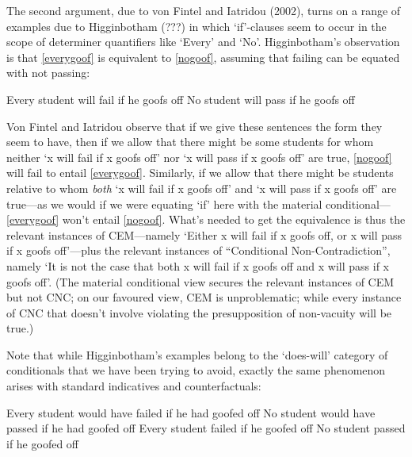 \documentclass[leqno, 11pt, a5paper, openany]{article}
\begin{document}
The second argument, due to von Fintel and Iatridou (2002), turns on a range of examples due to Higginbotham (???) in which ‘if’-clauses seem to occur in the scope of determiner quantifiers like ‘Every’ and ‘No’. Higginbotham's observation is that \ref{everygoof} is equivalent to \ref{nogoof}, assuming that failing can be equated with not passing:
\begin{prop}
	\nitem \label{everygoof}
	Every student will fail if he goofs off
	\nitem \label{nogoof}
	No student will pass if he goofs off
\end{prop}
Von Fintel and Iatridou observe that if we give these sentences the form they seem to have, then if we allow that there might be some students for whom neither ‘x will fail if x goofs off’ nor ‘x will pass if x goofs off’ are true, \ref{nogoof} will fail to entail \ref{everygoof}. Similarly, if we allow that there might be students relative to whom \emph{both} ‘x will fail if x goofs off’ and ‘x will pass if x goofs off’ are true---as we would if we were equating ‘if’ here with the material conditional---\ref{everygoof} won't entail \ref{nogoof}. What's needed to get the equivalence is thus the relevant instances of CEM---namely ‘Either x will fail if x goofs off, or x will pass if x goofs off’---plus the relevant instances of “Conditional Non-Contradiction”, namely ‘It is not the case that both x will fail if x goofs off and x will pass if x goofs off’. (The material conditional view secures the relevant instances of CEM but not CNC; on our favoured view, CEM is unproblematic; while every instance of CNC that doesn't involve violating the presupposition of non-vacuity will be true.)

Note that while Higginbotham's examples belong to the ‘does-will’ category of conditionals that we have been trying to avoid, exactly the same phenomenon arises with standard indicatives and counterfactuals:
\begin{prop}
	\nitem
	Every student would have failed if he had goofed off
	\nitem
	No student would have passed if he had goofed off
	\nitem \label{everygoofpast}
	Every student failed if he goofed off
	\nitem \label{nogoofpast}
	No student passed if he goofed off
\end{prop}
\end{document}

